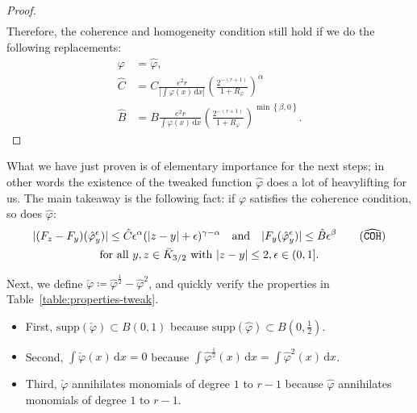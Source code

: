 \begin{proof}
\begin{align*}
    \end{align*}
    Therefore, the coherence and homogeneity condition still hold if we do the following replacements:
    \begin{align}
        \varphi &= \hat \varphi, \nonumber
        \\
        \hat C &= C\frac{e^2 r}{|\int \varphi(x)\, \mathrm{d}x|} \left(\frac{2^{-(r+1)}}{1+R_\varphi}\right)^\alpha \label{constant:hat-c}
        \\
        \hat B &= B\frac{e^2 r}{\int \varphi(x)\, \mathrm{d}x} \left(\frac{2^{-(r+1)}}{1+R_\varphi}\right)^{\min\left\{ \beta, 0 \right\} } \nonumber.
    \end{align}
\end{proof}

What we have just proven is of elementary importance for the next steps; in other words the existence of the tweaked function \(\hat \varphi\) does a lot of heavylifting for us. The main takeaway is the following fact: if \(\varphi\) satisfies the coherence condition, so does \(\hat \varphi\):
\begin{gather}\label{coherence-hat}
    |(F_z - F_y)(\hat \varphi^\epsilon_y)| \leq \hat C \epsilon^\alpha(|z-y| + \epsilon)^{\gamma - \alpha} \quad \text{and} \quad |F_y(\hat \varphi^\epsilon_y)| \leq \hat B\epsilon^\beta \tag{\({\widehat{\texttt{COH}}}\)} \\
    \text{for all } y,z \in \bar K_{3/2} \text{ with } |z-y| \leq 2,  \epsilon \in (0,1] .\nonumber
\end{gather}

Next, we define \(\check \varphi \coloneqq \hat \varphi^{\frac{1}{2}} - \hat \varphi^2\), and quickly verify the properties in Table~\ref{table:properties-tweak}.
\begin{itemize}
    \item First, \(\mathrm{supp}(\check \varphi) \subset B(0,1)\) because \(\mathrm{supp}(\hat \varphi) \subset B(0,\frac{1}{2})\).
    \item Second, \(\int \check \varphi(x) \, \mathrm{d}x = 0\) because \(\int \hat \varphi^{\frac{1}{2}}(x) \, \mathrm{d}x = \int \hat \varphi^2(x) \, \mathrm{d}x\).
    \item Third, \(\check \varphi\) annihilates monomials of degree \(1\) to \(r-1\) because  \(\hat \varphi\) annihilates monomials of degree \(1\) to \(r-1\).
\end{itemize}

